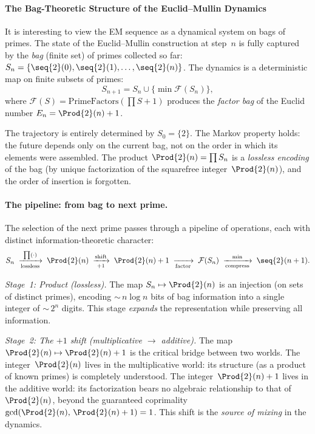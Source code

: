 \paragraph{The Bag-Theoretic Structure of the Euclid--Mullin Dynamics}
\label{app:bag}
It is interesting to view the EM sequence as a dynamical system on bags of primes.
The state of the Euclid--Mullin construction at step~$n$ is fully captured
by the \emph{bag} (finite set) of primes collected so far:
$S_n = \{\seq{2}(0), \seq{2}(1), \ldots, \seq{2}(n)\}$.
The dynamics is a deterministic map on finite subsets of primes:
\[
S_{n+1} = S_n \cup \{\min \mathcal{F}(S_n)\},
\]
where $\mathcal{F}(S) = \text{PrimeFactors}(\prod S + 1)$ produces the
\emph{factor bag} of the Euclid number $E_n = \Prod{2}(n) + 1$.

The trajectory is entirely determined by $S_0 = \{2\}$.  The Markov
property holds: the future depends only on the current bag, not on the
order in which its elements were assembled.  The product
$\Prod{2}(n) = \prod S_n$ is a \emph{lossless encoding} of the bag (by
unique factorization of the squarefree integer~$\Prod{2}(n)$), and the
order of insertion is forgotten.

\paragraph{The pipeline: from bag to next prime.}
The selection of the next prime passes through a pipeline of operations,
each with distinct information-theoretic character:
\[
S_n \;\xrightarrow[\text{lossless}]{\prod(\cdot)}\;
\Prod{2}(n) \;\xrightarrow[+1]{\text{shift}}\;
\Prod{2}(n)+1 \;\xrightarrow[\text{factor}]{}\;
\mathcal{F}(S_n) \;\xrightarrow[\text{compress}]{\min}\;
\seq{2}(n+1).
\]

\emph{Stage~1: Product (lossless).}  The map $S_n \mapsto \Prod{2}(n)$ is
an injection (on sets of distinct primes), encoding ${\sim}\, n \log n$
bits of bag information into a single integer of ${\sim}\, 2^n$ digits.
This stage \emph{expands} the representation while preserving all
information.

\emph{Stage~2: The $+1$ shift (multiplicative $\to$ additive).}  The map
$\Prod{2}(n) \mapsto \Prod{2}(n)+1$ is the critical bridge between two worlds.
The integer~$\Prod{2}(n)$ lives in the multiplicative world: its structure
(as a product of known primes) is completely understood.  The
integer~$\Prod{2}(n)+1$ lives in the additive world: its factorization
bears no algebraic relationship to that of~$\Prod{2}(n)$, beyond the
guaranteed coprimality $\gcd(\Prod{2}(n),\, \Prod{2}(n)+1) = 1$.  This shift
is the \emph{source of mixing} in the dynamics.

